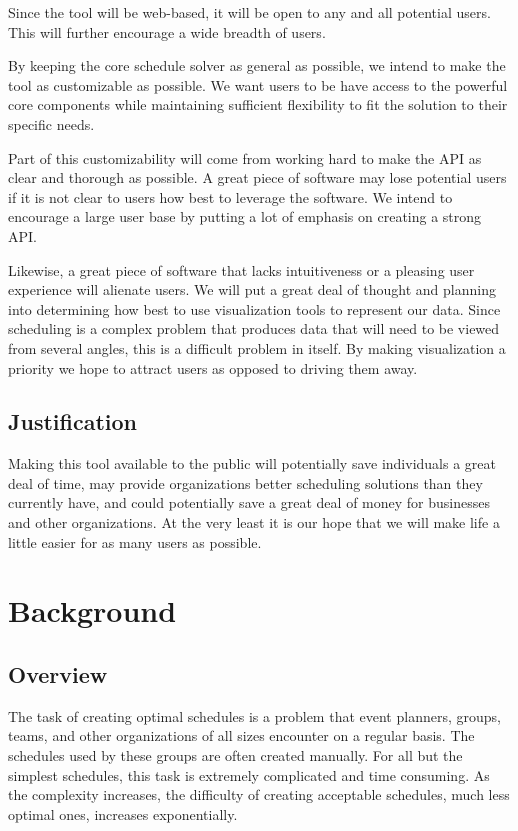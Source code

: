 \documentclass{extarticle}
\begin{document}
Since the tool will be web-based, it will be open to any and all potential users.  This will further encourage a
wide breadth of users.

By keeping the core schedule solver as general as possible, we intend to make the tool as customizable as possible.
We want users to be have access to the powerful core components while maintaining sufficient flexibility to fit the
solution to their specific needs.

Part of this customizability will come from working hard to make the API as clear and thorough as possible.  A
great piece of software may lose potential users if it is not clear to users how best to leverage the software.  We
intend to encourage a large user base by putting a lot of emphasis on creating a strong API.

Likewise, a great piece of software that lacks intuitiveness or a pleasing user experience will alienate users.
We will put a great deal of thought and planning into determining how best to use visualization tools to represent
our data.  Since scheduling is a complex problem that produces data that will need to be viewed from several angles,
this is a difficult problem in itself.  By making visualization a priority we hope to attract users as opposed to
driving them away.

\subsection{Justification}
Making this tool available to the public will potentially save individuals a great deal of time, may provide
organizations better scheduling solutions than they currently have, and could potentially save a great deal
of money for businesses and other organizations.  At the very least it is our hope that we will make life a little
easier for as many users as possible.

\section{Background}

\subsection{Overview} %
The task of creating optimal schedules is a problem that event planners, groups, teams, and other organizations of
all sizes encounter on a regular basis.  The schedules used by these groups are often created manually.  For all
but the simplest schedules, this task is extremely complicated and time consuming.  As the complexity increases,
the difficulty of creating acceptable schedules, much less optimal ones, increases exponentially.
\end{document}
